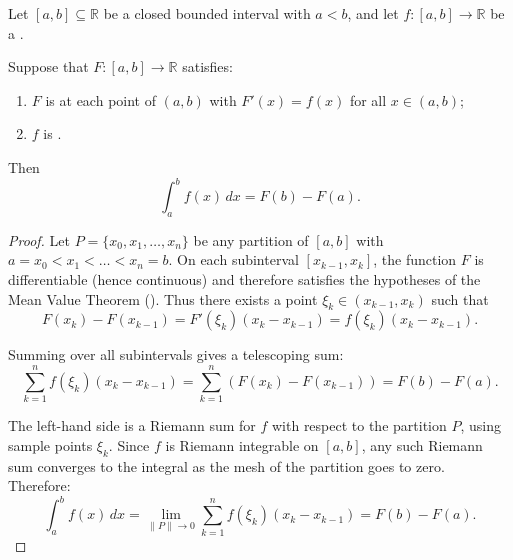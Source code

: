 \begin{theorem} \label{theorem:fundamental_theorem_of_calculus_part_two_evaluation_by_antiderivative}
    Let $[a, b] \subseteq \mathbb{R}$ be a closed bounded interval with $a < b$, and let $f : [a, b] \to \mathbb{R}$ be a .

    Suppose that $F : [a, b] \to \mathbb{R}$ satisfies:
    \begin{enumerate}
        \item $F$ is  at each point of $(a, b)$ with $F'(x) = f(x)$ for all $x \in (a, b)$;
        \item $f$ is .
    \end{enumerate}
    Then
    $$\int_a^b f(x)\,dx = F(b) - F(a).$$
\end{theorem}
\begin{proof}
    Let $P = \{x_0, x_1, \dots, x_n\}$ be any partition of $[a, b]$ with $a = x_0 < x_1 < \dots < x_n = b$. On each subinterval $[x_{k-1}, x_k]$, the function $F$ is differentiable (hence continuous) and therefore satisfies the hypotheses of the Mean Value Theorem (). Thus there exists a point $\xi_k \in (x_{k-1}, x_k)$ such that
    $$F(x_k) - F(x_{k-1}) = F'(\xi_k)(x_k - x_{k-1}) = f(\xi_k)(x_k - x_{k-1}).$$

    Summing over all subintervals gives a telescoping sum:
    $$\sum_{k=1}^n f(\xi_k)(x_k - x_{k-1}) = \sum_{k=1}^n (F(x_k) - F(x_{k-1})) = F(b) - F(a).$$

    The left-hand side is a Riemann sum for $f$ with respect to the partition $P$, using sample points $\xi_k$. Since $f$ is Riemann integrable on $[a, b]$, any such Riemann sum converges to the integral as the mesh of the partition goes to zero. Therefore:
    $$\int_a^b f(x)\,dx = \lim_{\|P\| \to 0} \sum_{k=1}^n f(\xi_k)(x_k - x_{k-1}) = F(b) - F(a).$$
\end{proof}

